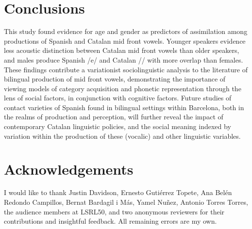 \documentclass[output=paper,colorlinks,citecolor=brown,draftmode]{langscibook}
\begin{document}
\section{Conclusions}
This study found evidence for age and gender as predictors of assimilation among productions of Spanish and Catalan mid front vowels. Younger speakers evidence less acoustic distinction between Catalan mid front vowels than older speakers, and males produce Spanish /e/ and Catalan /\textepsilon/ with more overlap than females. These findings contribute a variationist sociolinguistic analysis to the literature of bilingual production of mid front vowels, demonstrating the importance of viewing models of category acquisition and phonetic representation through the lens of social factors, in conjunction with cognitive factors. Future studies of contact varieties of Spanish found in bilingual settings within Barcelona, both in the realms of production and perception, will further reveal the impact of contemporary Catalan linguistic policies, and the social meaning indexed by variation within the production of these (vocalic) and other linguistic variables.

\section*{Acknowledgements}
    I would like to thank Justin Davidson, Ernesto Guti{\'e}rrez Topete, Ana Bel{\'e}n Redondo Campillos, Bernat Bardagil i M{\'a}s, Yamel Nu{\~n}ez, Antonio Torres Torres, the audience members at LSRL50, and two anonymous reviewers for their contributions and insightful feedback. All remaining errors are my own.

\printbibliography[heading=subbibliography,notkeyword=this]
\end{document}
